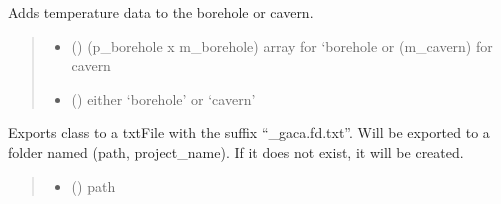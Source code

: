 \documentclass[letterpaper,10pt,english]{sphinxmanual}
\begin{document}
\begin{fulllineitems}
\begin{fulllineitems}
\label{\detokenize{tscw_module:tscw_module.tscw_DataClassesInput.GacaFieldData.add_temperature}}
\pysigstartsignatures
{}
\pysigstopsignatures
\sphinxAtStartPar
Adds temperature data to the borehole or cavern.
\begin{quote}\begin{description}
\begin{itemize}
\item {} 
\sphinxAtStartPar
{} () \textendash{} (p\_borehole x m\_borehole) array for ‘borehole or
(m\_cavern) for cavern

\item {} 
\sphinxAtStartPar
{} () \textendash{} either ‘borehole’ or ‘cavern’

\end{itemize}

\end{description}\end{quote}

\end{fulllineitems}


\begin{fulllineitems}
\label{\detokenize{tscw_module:tscw_module.tscw_DataClassesInput.GacaFieldData.export_fieldData}}
\pysigstartsignatures
{}
\pysigstopsignatures
\sphinxAtStartPar
Exports class to a txt\sphinxhyphen{}File with the suffix “\_gaca.fd.txt”.
Will be exported to a folder named (path, project\_name). If it does not exist, it will be created.
\begin{quote}\begin{description}
\begin{itemize}
\item {} 
\sphinxAtStartPar
{} () \textendash{} path


\end{itemize}
\end{description}
\end{quote}
\end{fulllineitems}
\end{fulllineitems}
\end{document}
